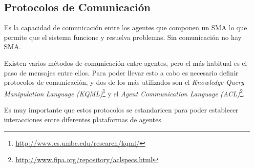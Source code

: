 \subsection{Protocolos de Comunicación}

Es la capacidad de comunicación entre los agentes que componen un SMA lo que
permite que el sistema funcione y resuelva problemas. Sin comunicación no hay
SMA.

Existen varios métodos de comunicación entre agentes, pero el más habitual es
el paso de mensajes entre ellos. Para poder llevar esto a cabo es necesario
definir protocolos de comunicación, y dos de los más utilizados son el {\em
Knowledge Query Manipulation Language
(KQML)}\footnote{\url{http://www.cs.umbc.edu/research/kqml/}} y el {\em Agent
Communication Language
(ACL)}\footnote{\url{http://www.fipa.org/repository/aclspecs.html}}.

Es muy importante que estos protocolos se estandaricen para poder establecer
interacciones entre diferentes plataformas de agentes.

